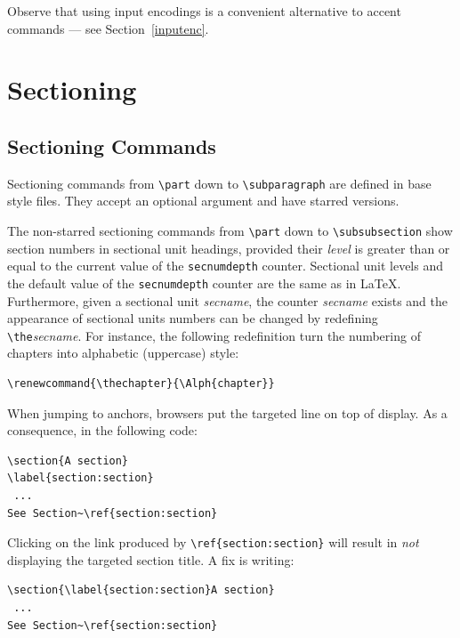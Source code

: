 Observe that using input encodings
is a convenient alternative to accent commands ---
see Section~\ref{inputenc}.

\section{Sectioning}

\subsection{\label{section:section}Sectioning Commands}
Sectioning commands from \verb+\part+ down to
\verb+\subparagraph+ are defined in base style files.
They accept an optional argument and have starred versions.


The non-starred sectioning commands from \verb+\part+ down to
\verb+\subsubsection+ show section numbers in sectional unit headings,
provided their \textit{level} is greater than or equal to the current
value of the \verb+secnumdepth+ counter.
Sectional unit levels and the default value of the \verb+secnumdepth+ counter
are the same as in \LaTeX{}.
Furthermore, given a sectional unit {\it secname}, the
counter {\it secname} exists and the appearance of sectional units
numbers can be changed by redefining \verb+\the+{\it secname}.
For instance, the following redefinition turn the numbering of
chapters into alphabetic (uppercase) style:
\begin{verbatim}
\renewcommand{\thechapter}{\Alph{chapter}}
\end{verbatim}

When jumping to anchors, browsers put the targeted line on top
of display. As a consequence, in the following code:
\begin{verbatim}
\section{A section}
\label{section:section}
 ...
See Section~\ref{section:section}
\end{verbatim}
Clicking on the link produced by
\verb"\ref{section:section}" will result in \emph{not} displaying the
targeted section title.
A fix is writing:
\begin{verbatim}
\section{\label{section:section}A section}
 ...
See Section~\ref{section:section}
\end{verbatim}

